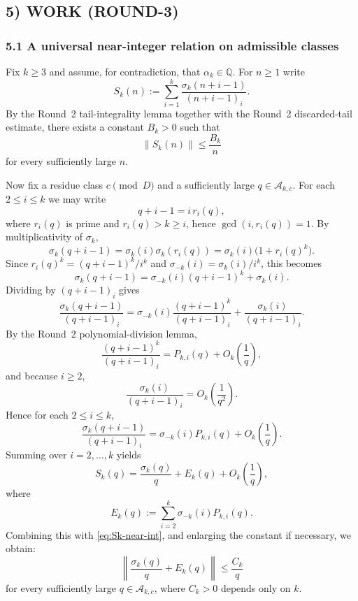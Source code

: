 \subsection*{5) WORK (ROUND-3)}
\subsubsection*{5.1 A universal near-integer relation on admissible classes}
Fix $k\ge 3$ and assume, for contradiction, that $\alpha_k\in\mathbb{Q}$.
For $n\ge 1$ write
\[
S_k(n):=\sum_{i=1}^{k}\frac{\sigma_k(n+i-1)}{(n+i-1)_i}.
\]
By the Round~2 tail-integrality lemma together with the Round~2 discarded-tail estimate, there exists a constant $B_k>0$ such that
\begin{equation}\label{eq:Sk-near-int}
\|S_k(n)\|\le \frac{B_k}{n}
\end{equation}
for every sufficiently large $n$.

Now fix a residue class $c\pmod D$ and a sufficiently large $q\in\mathcal{A}_{k,c}$. For each $2\le i\le k$ we may write
\[
q+i-1=i\,r_i(q),
\]
where $r_i(q)$ is prime and $r_i(q)>k\ge i$, hence $\gcd(i,r_i(q))=1$. By multiplicativity of $\sigma_k$,
\[
\sigma_k(q+i-1)=\sigma_k(i)\sigma_k(r_i(q))=\sigma_k(i)\bigl(1+r_i(q)^k\bigr).
\]
Since $r_i(q)^k=(q+i-1)^k/i^k$ and $\sigma_{-k}(i)=\sigma_k(i)/i^k$, this becomes
\[
\sigma_k(q+i-1)=\sigma_{-k}(i)(q+i-1)^k+\sigma_k(i).
\]
Dividing by $(q+i-1)_i$ gives
\[
\frac{\sigma_k(q+i-1)}{(q+i-1)_i}
=\sigma_{-k}(i)\frac{(q+i-1)^k}{(q+i-1)_i}+\frac{\sigma_k(i)}{(q+i-1)_i}.
\]
By the Round~2 polynomial-division lemma,
\[
\frac{(q+i-1)^k}{(q+i-1)_i}=P_{k,i}(q)+O_k\!\left(\frac1q\right),
\]
and because $i\ge 2$,
\[
\frac{\sigma_k(i)}{(q+i-1)_i}=O_k\!\left(\frac1{q^2}\right).
\]
Hence for each $2\le i\le k$,
\[
\frac{\sigma_k(q+i-1)}{(q+i-1)_i}=\sigma_{-k}(i)P_{k,i}(q)+O_k\!\left(\frac1q\right).
\]
Summing over $i=2,\dots,k$ yields
\[
S_k(q)=\frac{\sigma_k(q)}{q}+E_k(q)+O_k\!\left(\frac1q\right),
\]
where
\[
E_k(q):=\sum_{i=2}^{k}\sigma_{-k}(i)P_{k,i}(q).
\]
Combining this with \eqref{eq:Sk-near-int}, and enlarging the constant if necessary, we obtain:
\begin{equation}\label{eq:master-near-int}
\left\|\frac{\sigma_k(q)}{q}+E_k(q)\right\|\le \frac{C_k}{q}
\end{equation}
for every sufficiently large $q\in\mathcal{A}_{k,c}$, where $C_k>0$ depends only on $k$.

